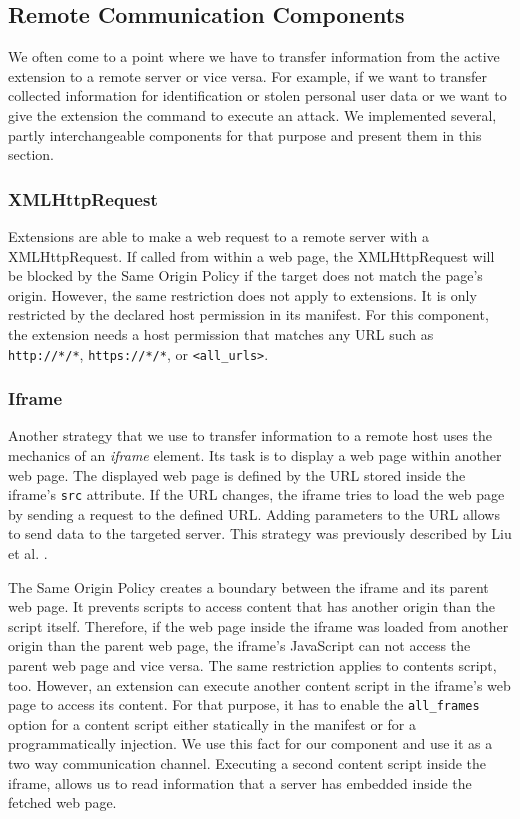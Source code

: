 \subsection{Remote Communication Components}
\label{sec:remoteCommunication}

	We often come to a point where we have to transfer information from the active extension to a remote server or vice versa. For example, if we want to transfer collected information for identification or stolen personal user data or we want to give the extension the command to execute an attack. We implemented several, partly interchangeable components for that purpose and present them in this section.

\subsubsection{XMLHttpRequest}
\label{sec:xhrCommunication}

	Extensions are able to make a web request to a remote server with a XMLHttpRequest. If called from within a web page, the XMLHttpRequest will be blocked by the Same Origin Policy if the target does not match the page's origin. However, the same restriction does not apply to extensions. It is only restricted by the declared host permission in its manifest. For this component, the extension needs a host permission that matches any URL such as \texttt{http://*/*}, \texttt{https://*/*}, or \texttt{<all\_urls>}. 

\subsubsection{Iframe}
\label{sec:iframeCommunication}

	Another strategy that we use to transfer information to a remote host uses the mechanics of an \textit{iframe} element. Its task is to display a web page within another web page. The displayed web page is defined by the URL stored inside the iframe's \texttt{src} attribute. If the URL changes, the iframe tries to load the web page by sending a request to the defined URL. Adding parameters to the URL allows to send data to the targeted server. This strategy was previously described by Liu et al. \cite{Liu12chromeextensions:}.

	The Same Origin Policy creates a boundary between the iframe and its parent web page. It prevents scripts to access content that has another origin than the script itself. Therefore, if the web page inside the iframe was loaded from another origin than the parent web page, the iframe's JavaScript can not access the parent web page and vice versa. The same restriction applies to contents script, too. However, an extension can execute another content script in the iframe's web page to access its content. For that purpose, it has to enable the \texttt{all\_frames} option for a content script either statically in the manifest or for a programmatically injection. We use this fact for our component and use it as a two way communication channel. Executing a second content script inside the iframe, allows us to read information that a server has embedded inside the fetched web page.

